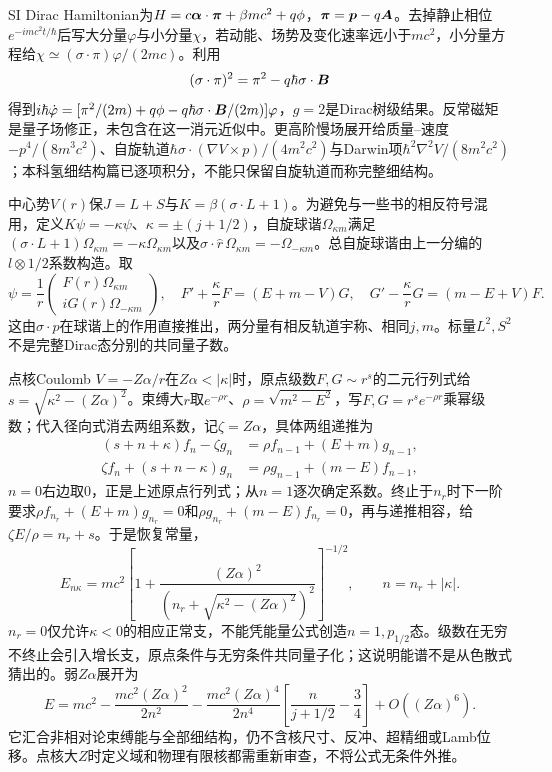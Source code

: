 SI Dirac Hamiltonian为$H=c\boldsymbol{\alpha}\cdot\boldsymbol{\pi}+\beta mc^2+q\phi$，$\boldsymbol{\pi}=\boldsymbol{p}-q\boldsymbol{A}$。去掉静止相位$e^{-imc^2t/\hbar}$后写大分量$\varphi$与小分量$\chi$，若动能、场势及变化速率远小于$mc^2$，小分量方程给$\chi\simeq(\sigma\cdot\pi)\varphi/(2mc)$。利用
\[
 (\sigma\cdot\pi)^2=\pi^2-q\hbar\sigma\cdot\boldsymbol{B}
\]
得到$i\hbar\dot\varphi=[\pi^2/(2m)+q\phi-q\hbar\sigma\cdot\boldsymbol{B}/(2m)]\varphi$，$g=2$是Dirac树级结果。反常磁矩是量子场修正，未包含在这一消元近似中。更高阶慢场展开给质量--速度$-p^4/(8m^3c^2)$、自旋轨道$\hbar\sigma\cdot(\nabla V\times p)/(4m^2c^2)$与Darwin项$\hbar^2\nabla^2V/(8m^2c^2)$；本科氢细结构篇已逐项积分，不能只保留自旋轨道而称完整细结构。

中心势$V(r)$保$J=L+S$与$K=\beta(\sigma\cdot L+1)$。为避免与一些书的相反符号混用，定义$K\psi=-\kappa\psi$、$\kappa=\pm(j+1/2)$，自旋球谐$\Omega_{\kappa m}$满足$(\sigma\cdot L+1)\Omega_{\kappa m}=-\kappa\Omega_{\kappa m}$以及$\sigma\cdot\hat r\,\Omega_{\kappa m}=-\Omega_{-\kappa m}$。总自旋球谐由上一分编的$l\otimes1/2$系数构造。取
\[
 \psi=\frac1r\begin{pmatrix}F(r)\Omega_{\kappa m}\\iG(r)\Omega_{-\kappa m}\end{pmatrix},\quad
 F'+\frac\kappa rF=(E+m-V)G,\quad
 G'-\frac\kappa rG=(m-E+V)F.
\]
这由$\sigma\cdot p$在球谐上的作用直接推出，两分量有相反轨道宇称、相同$j,m$。标量$L^2,S^2$不是完整Dirac态分别的共同量子数。

点核Coulomb $V=-Z\alpha/r$在$Z\alpha<|\kappa|$时，原点级数$F,G\sim r^s$的二元行列式给$s=\sqrt{\kappa^2-(Z\alpha)^2}$。束缚大$r$取$e^{-\rho r}$、$\rho=\sqrt{m^2-E^2}$，写$F,G=r^se^{-\rho r}$乘幂级数；代入径向式消去两组系数，记$\zeta=Z\alpha$，具体两组递推为
\[
 \begin{aligned}
 (s+n+\kappa)f_n-\zeta g_n&=\rho f_{n-1}+(E+m)g_{n-1},\\
 \zeta f_n+(s+n-\kappa)g_n&=\rho g_{n-1}+(m-E)f_{n-1},
 \end{aligned}
\]
$n=0$右边取0，正是上述原点行列式；从$n=1$逐次确定系数。终止于$n_r$时下一阶要求$\rho f_{n_r}+(E+m)g_{n_r}=0$和$\rho g_{n_r}+(m-E)f_{n_r}=0$，再与递推相容，给$\zeta E/\rho=n_r+s$。于是恢复常量，
\[
 E_{n\kappa}=mc^2\left[1+\frac{(Z\alpha)^2}
 {(n_r+\sqrt{\kappa^2-(Z\alpha)^2})^2}\right]^{-1/2},\qquad
 n=n_r+|\kappa|.
\]
$n_r=0$仅允许$\kappa<0$的相应正常支，不能凭能量公式创造$n=1,p_{1/2}$态。级数在无穷不终止会引入增长支，原点条件与无穷条件共同量子化；这说明能谱不是从色散式猜出的。弱$Z\alpha$展开为
\[
 E=mc^2-\frac{mc^2(Z\alpha)^2}{2n^2}
 -\frac{mc^2(Z\alpha)^4}{2n^4}
 \left[\frac n{j+1/2}-\frac34\right]+O((Z\alpha)^6).
\]
它汇合非相对论束缚能与全部细结构，仍不含核尺寸、反冲、超精细或Lamb位移。点核大$Z$时定义域和物理有限核都需重新审查，不将公式无条件外推。


